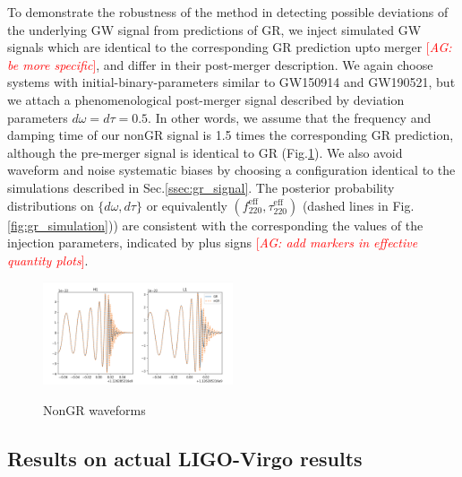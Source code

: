 \documentclass[twocolumn,prd,superscriptaddress,amsfonts,amssymb,amsmath,preprintnumbers]{revtex4-1}
\newcommand{\abhi}[1]{\textcolor{red}{[\textit{AG: #1}]}}
\begin{document}
To demonstrate the robustness of the method in detecting possible deviations of the underlying GW signal from predictions of GR, we inject simulated GW signals which are identical to the corresponding GR prediction upto merger \abhi{be more specific}, and differ in their post-merger description. We again choose systems with initial-binary-parameters similar to GW150914 and GW190521, but we attach a phenomenological post-merger signal described by deviation parameters $d\omega =d\tau = 0.5$. In other words, we assume that the frequency and damping time of our nonGR signal is 1.5 times the corresponding GR prediction, although the pre-merger signal is identical to GR (Fig.\ref{fig:nongr_waveform}). We also avoid waveform and noise systematic biases by choosing a configuration identical to the simulations described in Sec.\ref{ssec:gr_signal}. The posterior probability distributions on $\{d\omega,d\tau\}$ or equivalently $(f_{220}^{\text{eff}}, \tau _{220}^{\text{eff}})$ (dashed lines in Fig.\ref{fig:gr_simulation})) are consistent with the corresponding the values of the injection parameters, indicated by plus signs \abhi{add markers in effective quantity plots}.

\begin{figure}[H]
	\includegraphics[width=0.5\textwidth]{figures/modGR_waveforms.png}\label{fig:nongr_waveform}
	\caption{NonGR waveforms}
\end{figure}

\subsection{Results on actual LIGO-Virgo results}
\end{document}
